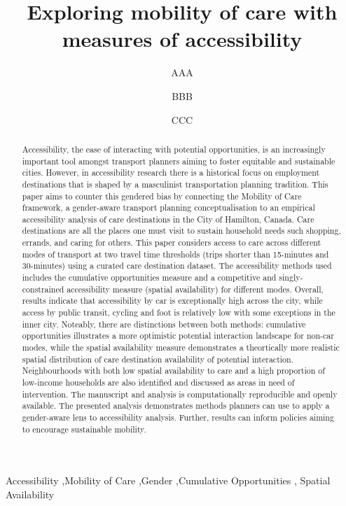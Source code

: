 \documentclass[
  authoryear,
  preprint,
  3p]{elsarticle}
\begin{document}
\begin{frontmatter}
\title{Exploring mobility of care with measures of accessibility}
\author[1]{AAA%
%
}
\author[]{BBB%
%
}
\author[]{CCC%
%
}





        
\begin{abstract}
Accessibility, the ease of interacting with potential opportunities, is
an increasingly important tool amongst transport planners aiming to
foster equitable and sustainable cities. However, in accessibility
research there is a historical focus on employment destinations that is
shaped by a masculinist transportation planning tradition. This paper
aims to counter this gendered bias by connecting the Mobility of Care
framework, a gender-aware transport planning conceptualisation to an
empirical accessibility analysis of care destinations in the City of
Hamilton, Canada. Care destinations are all the places one must visit to
sustain household needs such shopping, errands, and caring for others.
This paper considers access to care across different modes of transport
at two travel time thresholds (trips shorter than 15-minutes and
30-minutes) using a curated care destination dataset. The accessibility
methods used includes the cumulative opportunities measure and a
competitive and singly-constrained accessibility measure (spatial
availability) for different modes. Overall, results indicate that
accessibility by car is exceptionally high across the city, while access
by public transit, cycling and foot is relatively low with some
exceptions in the inner city. Noteably, there are distinctions between
both methods: cumulative opportunities illustrates a more optimistic
potential interaction landscape for non-car modes, while the spatial
availability measure demonstrates a theortically more realistic spatial
distribution of care destination availability of potential interaction.
Neighbourhoods with both low spatial availability to care and a high
proportion of low-income households are also identified and discussed as
areas in need of intervention. The manuscript and analysis is
computationally reproducible and openly available. The presented
analysis demonstrates methods planners can use to apply a gender-aware
lens to accessibility analysis. Further, results can inform policies
aiming to encourage sustainable mobility.
\end{abstract}





\begin{keyword}
    Accessibility \sep Mobility of Care \sep Gender \sep Cumulative
Opportunities \sep 
    Spatial Availability
\end{keyword}
\end{frontmatter}
    
\end{document}
